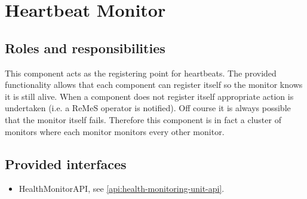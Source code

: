 \section{Heartbeat Monitor}
\label{element:heartbeat-monitor}

\subsection{Roles and responsibilities}

\npar This component acts as the registering point for heartbeats. The provided
functionality allows that each component can register itself so the monitor
knows it is still alive. When a component does not register itself appropriate
action is undertaken (i.e. a ReMeS operator is notified). Off course it is
always possible that the monitor itself fails. Therefore this component is in
fact a cluster of monitors where each monitor monitors every other monitor.

\subsection{Provided interfaces}

\begin{itemize}
  \item HealthMonitorAPI, see \ref{api:health-monitoring-unit-api}.
\end{itemize}



